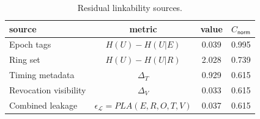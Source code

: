 \begin{table}[htbp]
\centering
\caption{Residual linkability sources.}
\label{tab:residual-sources}
\begin{tabular}{@{}lccc@{}}
\toprule
source & metric & value & $C_{\mathsf{norm}}$ \\
\midrule
Epoch tags & $H(U)-H(U|E)$ & 0.039 & 0.995 \\
Ring set & $H(U)-H(U|R)$ & 2.028 & 0.739 \\
Timing metadata & $\Delta_T$ & 0.929 & 0.615 \\
Revocation visibility & $\Delta_V$ & 0.033 & 0.615 \\
Combined leakage & $\epsilon_{\mathcal{L}}=PLA(E,R,O,T,V)$ & 0.037 & 0.615 \\
\bottomrule
\end{tabular}
\end{table}
